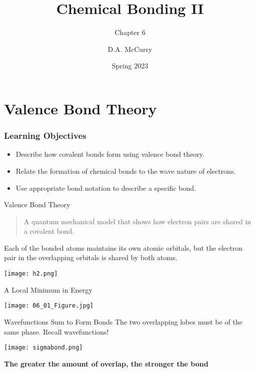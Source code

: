 \documentclass[notes=only]{beamer}
\title{Chemical Bonding II}
\subtitle{Chapter 6}
\institute{CHEM115 --- Chemistry for the Sciences I \\ Bloomsburg University}
\author{D.A. McCurry}
\date{Spring 2023}
\begin{document}
\maketitle

\section{Valence Bond Theory}

\begin{frame}
	\frametitle{Learning Objectives}

	\begin{itemize}
		\item Describe how covalent bonds form using valence bond theory.
		\item Relate the formation of chemical bonds to the wave nature of
			electrons.
		\item Use appropriate bond notation to describe a specific bond.
	\end{itemize}
\end{frame}

\begin{frame}[c]{Valence Bond Theory}
	\begin{quote}
		A quantum mechanical model that shows how electron pairs are
		shared in a covalent bond.
	\end{quote}

	\bigskip
	Each of the bonded atoms maintains its own atomic orbitals, but the
	electron pair in the \alert{overlapping} orbitals is shared by both atoms.
		
	\begin{center}
		\texttt{[image: h2.png]}
	\end{center}
\end{frame}

\begin{frame}{A Local Minimum in Energy}
	\begin{center}
		\texttt{[image: 06\_01\_Figure.jpg]}
	\end{center}
\end{frame}
	
\begin{frame}{Wavefunctions Sum to Form Bonds}
	The two overlapping lobes must be of the \alert{same phase}.  Recall
	\alert{wavefunctions}!
	\begin{center}
		\texttt{[image: sigmabond.png]}
	\end{center}

	\begin{center}
		\bfseries
		The greater the amount of overlap, the stronger the bond
	\end{center}
\end{frame}
\end{document}
